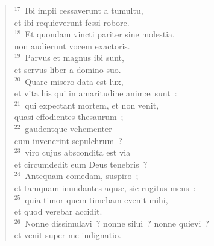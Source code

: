 \begin{flushleft}
\begin{verse}
${}^{17}$~Ibi impii cessaverunt a tumultu,\\ et ibi requieverunt fessi robore.\\
${}^{18}$~Et quondam vincti pariter sine molestia,\\ non audierunt vocem exactoris.\\
${}^{19}$~Parvus et magnus ibi sunt,\\ et servus liber a domino suo.\\
${}^{20}$~Quare misero data est lux,\\ et vita his qui in amaritudine anim\ae\ sunt~:\\
${}^{21}$~qui expectant mortem, et non venit,\\ quasi effodientes thesaurum~;\\
${}^{22}$~gaudentque vehementer\\ cum invenerint sepulchrum~?\\
${}^{23}$~viro cujus abscondita est via\\ et circumdedit eum Deus tenebris~?\\
${}^{24}$~Antequam comedam, suspiro~;\\ et tamquam inundantes aqu\ae , sic rugitus meus~:\\
${}^{25}$~quia timor quem timebam evenit mihi,\\ et quod verebar accidit.\\
${}^{26}$~Nonne dissimulavi~? nonne silui~? nonne quievi~?\\ et venit super me indignatio.\end{verse}\end{flushleft}



